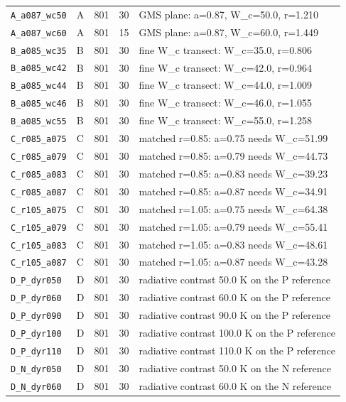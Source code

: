 {\begin{longtable}{llrrp{7.0cm}}
\texttt{A\_a087\_wc50} & A & 801 & 30 & GMS plane: a=0.87, W\_c=50.0, r=1.210\\
\texttt{A\_a087\_wc60} & A & 801 & 15 & GMS plane: a=0.87, W\_c=60.0, r=1.449\\
\texttt{B\_a085\_wc35} & B & 801 & 30 & fine W\_c transect: W\_c=35.0, r=0.806\\
\texttt{B\_a085\_wc42} & B & 801 & 30 & fine W\_c transect: W\_c=42.0, r=0.964\\
\texttt{B\_a085\_wc44} & B & 801 & 30 & fine W\_c transect: W\_c=44.0, r=1.009\\
\texttt{B\_a085\_wc46} & B & 801 & 30 & fine W\_c transect: W\_c=46.0, r=1.055\\
\texttt{B\_a085\_wc55} & B & 801 & 30 & fine W\_c transect: W\_c=55.0, r=1.258\\
\texttt{C\_r085\_a075} & C & 801 & 30 & matched r=0.85: a=0.75 needs W\_c=51.99\\
\texttt{C\_r085\_a079} & C & 801 & 30 & matched r=0.85: a=0.79 needs W\_c=44.73\\
\texttt{C\_r085\_a083} & C & 801 & 30 & matched r=0.85: a=0.83 needs W\_c=39.23\\
\texttt{C\_r085\_a087} & C & 801 & 30 & matched r=0.85: a=0.87 needs W\_c=34.91\\
\texttt{C\_r105\_a075} & C & 801 & 30 & matched r=1.05: a=0.75 needs W\_c=64.38\\
\texttt{C\_r105\_a079} & C & 801 & 30 & matched r=1.05: a=0.79 needs W\_c=55.41\\
\texttt{C\_r105\_a083} & C & 801 & 30 & matched r=1.05: a=0.83 needs W\_c=48.61\\
\texttt{C\_r105\_a087} & C & 801 & 30 & matched r=1.05: a=0.87 needs W\_c=43.28\\
\texttt{D\_P\_dyr050} & D & 801 & 30 & radiative contrast 50.0 K on the P reference\\
\texttt{D\_P\_dyr060} & D & 801 & 30 & radiative contrast 60.0 K on the P reference\\
\texttt{D\_P\_dyr090} & D & 801 & 30 & radiative contrast 90.0 K on the P reference\\
\texttt{D\_P\_dyr100} & D & 801 & 30 & radiative contrast 100.0 K on the P reference\\
\texttt{D\_P\_dyr110} & D & 801 & 30 & radiative contrast 110.0 K on the P reference\\
\texttt{D\_N\_dyr050} & D & 801 & 30 & radiative contrast 50.0 K on the N reference\\
\texttt{D\_N\_dyr060} & D & 801 & 30 & radiative contrast 60.0 K on the N reference\\

\end{longtable}}
